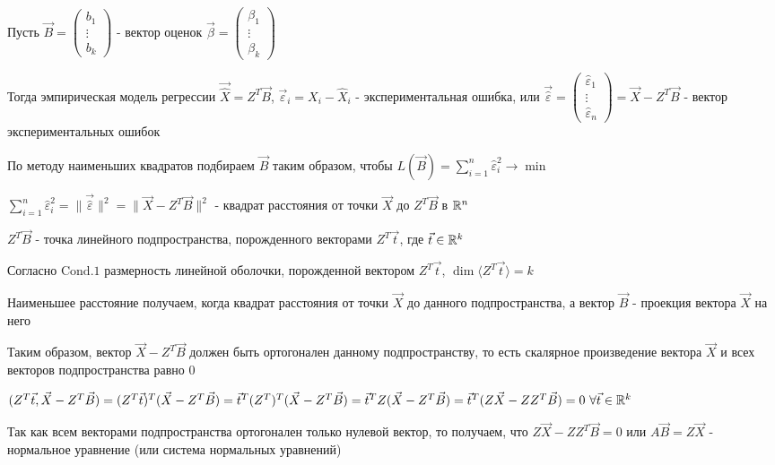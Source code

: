 \documentclass[12pt]{article}
\begin{document}
\begin{enumerate}
    Пусть $\vec B = \begin{pmatrix}b_1 \\ \vdots \\ b_k\end{pmatrix}$ - вектор оценок $\vec \beta = \begin{pmatrix}\beta_1 \\ \vdots \\ \beta_k\end{pmatrix}$

    Тогда эмпирическая модель регрессии $\vec{\hat X} = Z^T \vec B$, 
    $\vec \varepsilon_i = X_i - \hat X_i$ - экспериментальная ошибка, или $\vec {\hat \varepsilon} = \begin{pmatrix}\hat \varepsilon_1 \\ \vdots \\ \hat \varepsilon_n\end{pmatrix} = \vec X - Z^T \vec B$ - вектор экспериментальных ошибок

    По методу наименьших квадратов подбираем $\vec B$ таким образом, чтобы $L(\vec B) = \sum_{i = 1}^n \hat \varepsilon_i^2 \longrightarrow \min$

    $\sum_{i = 1}^n \hat \varepsilon_i^2 = \|\vec{\hat \varepsilon}\|^2 = \| \vec X - Z^T \vec B\|^2$ - квадрат расстояния от точки $\vec X$ до $Z^T \vec B$ в $\mathbb{R}^n$

    $Z^T \vec B$ - точка линейного подпространства, порожденного векторами $Z^T \vec t$, где $\vec t \in \mathbb{R}^k$

    \Nota Согласно $\mathrm{Cond. 1}$ размерность линейной оболочки, порожденной вектором $Z^T \vec t$,  $\dim \langle Z^T \vec t \rangle = k$

    Наименьшее расстояние получаем, когда квадрат расстояния от точки $\vec X$ до данного подпространства, а вектор $\vec B$ - проекция вектора $\vec X$ на него

    Таким образом, вектор $\vec X - Z^T \vec B$ должен быть ортогонален данному подпространству, то есть скалярное произведение вектора $\vec X$ и всех векторов подпространства равно 0

    $(Z^T \vec t, \vec X - Z^T \vec B) = (Z^T \vec t)^T (\vec X - Z^T \vec B) = {\vec t}^T (Z^T)^T (\vec X - Z^T \vec B) = {\vec t}^T Z (\vec X - Z^T \vec B) = 
    {\vec t}^T (Z \vec X - Z Z ^T \vec B) = 0 \ \forall \vec t \in \mathbb{R}^k$

    Так как всем векторами подпространства ортогонален только нулевой вектор, то получаем, что $Z \vec X - Z Z^T \vec B = 0$ или $A \vec B = Z \vec X$ - нормальное уравнение (или система нормальных уравнений)


\end{enumerate}
\end{document}

